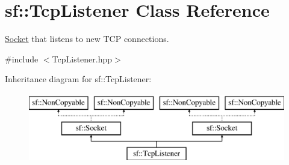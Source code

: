 \hypertarget{classsf_1_1_tcp_listener}{\section{sf\-:\-:Tcp\-Listener Class Reference}
\label{classsf_1_1_tcp_listener}
}


\hyperlink{classsf_1_1_socket}{Socket} that listens to new T\-C\-P connections.  




{\ttfamily \#include $<$Tcp\-Listener.\-hpp$>$}

Inheritance diagram for sf\-:\-:Tcp\-Listener\-:\begin{figure}[H]
\begin{center}
\leavevmode
\includegraphics[height=3.000000cm]{classsf_1_1_tcp_listener}
\end{center}
\end{figure}
